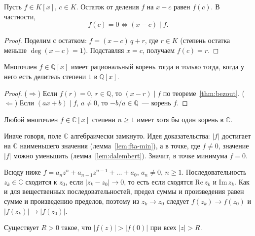 \documentclass[12pt]{article}
\begin{document}
	\begin{theorem}[Безу]\label{thm:bezout}
		Пусть $f \in K[x]$, $c \in K$. Остаток от деления $f$ на $x - c$ равен $f(c)$. В частности,
		\[
			f(c) = 0 \iff (x - c) \mid f.
		\]
	\end{theorem}

	\begin{proof}
		Поделим с остатком: $f = (x - c)\,q + r$, где $r \in K$ (степень остатка меньше $\deg(x - c) = 1$). Подставляя $x = c$, получаем $f(c) = r$.
	\end{proof}

	\begin{corollary}\label{cor:rational-root-linear}
		Многочлен $f \in \mathbb{Q}[x]$ имеет рациональный корень тогда и только тогда, когда у него есть делитель степени $1$ в $\mathbb{Q}[x]$.
	\end{corollary}

	\begin{proof}
		($\Rightarrow$) Если $f(r) = 0$, $r \in \mathbb{Q}$, то $(x - r) \mid f$ по теореме~\ref{thm:bezout}. ($\Leftarrow$) Если $(ax + b) \mid f$, $a \ne 0$, то $-b/a \in \mathbb{Q}$~--- корень $f$.
	\end{proof}

	\begin{theorem}\label{thm:fta}
		Любой многочлен $f \in \mathbb{C}[x]$ степени $n \geqslant 1$ имеет хотя бы один корень в $\mathbb{C}$.
	\end{theorem}

	\begin{note}
		Иначе говоря, поле $\mathbb{C}$ алгебраически замкнуто. Идея доказательства: $|f|$ достигает на $\mathbb{C}$ наименьшего значения (лемма~\ref{lem:fta-min}), а в точке, где $f \ne 0$, значение $|f|$ можно уменьшить (лемма~\ref{lem:dalembert}). Значит, в точке минимума $f = 0$.

		Всюду ниже $f = a_n z^n + a_{n-1} z^{n-1} + \dots + a_0$, $a_n \ne 0$, $n \geqslant 1$. Последовательность $z_k \in \mathbb{C}$ сходится к $z_0$, если $|z_k - z_0| \to 0$, то есть если сходятся $\mathrm{Re}\, z_k$ и $\mathrm{Im}\, z_k$. Как и для вещественных последовательностей, предел суммы и произведения равен сумме и произведению пределов, поэтому из $z_k \to z_0$ следует $f(z_k) \to f(z_0)$ и $|f(z_k)| \to |f(z_0)|$.
	\end{note}

	\begin{lemma}\label{lem:fta-growth}
		Существует $R > 0$ такое, что $|f(z)| > |f(0)|$ при всех $|z| > R$.
	\end{lemma}
\end{document}
